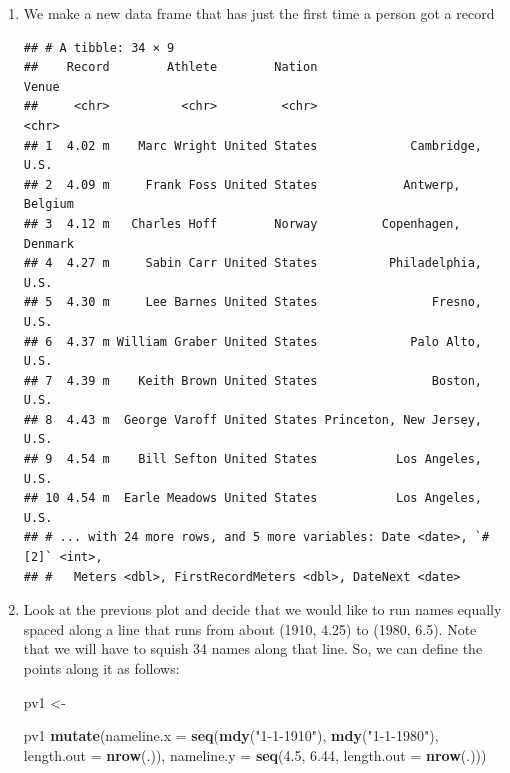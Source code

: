 \documentclass[]{book}
\newenvironment{Shaded}{\begin{snugshade}}{\end{snugshade}}
\newcommand{\KeywordTok}[1]{\textcolor[rgb]{0.13,0.29,0.53}{\textbf{{#1}}}}
\newcommand{\DataTypeTok}[1]{\textcolor[rgb]{0.13,0.29,0.53}{{#1}}}
\newcommand{\DecValTok}[1]{\textcolor[rgb]{0.00,0.00,0.81}{{#1}}}
\newcommand{\FloatTok}[1]{\textcolor[rgb]{0.00,0.00,0.81}{{#1}}}
\newcommand{\StringTok}[1]{\textcolor[rgb]{0.31,0.60,0.02}{{#1}}}
\newcommand{\CommentTok}[1]{\textcolor[rgb]{0.56,0.35,0.01}{\textit{{#1}}}}
\newcommand{\NormalTok}[1]{{#1}}
\theoremstyle{definition}
\theoremstyle{definition}
\theoremstyle{remark}
\begin{document}
\begin{enumerate}
\def\labelenumi{\arabic{enumi}.}
\item
  We make a new data frame that has just the first time a person got a
  record

\begin{Shaded}
\end{Shaded}

\begin{verbatim}
## # A tibble: 34 × 9
##    Record        Athlete        Nation                       Venue
##     <chr>          <chr>         <chr>                       <chr>
## 1  4.02 m    Marc Wright United States             Cambridge, U.S.
## 2  4.09 m     Frank Foss United States            Antwerp, Belgium
## 3  4.12 m   Charles Hoff        Norway         Copenhagen, Denmark
## 4  4.27 m     Sabin Carr United States          Philadelphia, U.S.
## 5  4.30 m     Lee Barnes United States                Fresno, U.S.
## 6  4.37 m William Graber United States             Palo Alto, U.S.
## 7  4.39 m    Keith Brown United States                Boston, U.S.
## 8  4.43 m  George Varoff United States Princeton, New Jersey, U.S.
## 9  4.54 m    Bill Sefton United States           Los Angeles, U.S.
## 10 4.54 m  Earle Meadows United States           Los Angeles, U.S.
## # ... with 24 more rows, and 5 more variables: Date <date>, `#[2]` <int>,
## #   Meters <dbl>, FirstRecordMeters <dbl>, DateNext <date>
\end{verbatim}
\item
  Look at the previous plot and decide that we would like to run names
  equally spaced along a line that runs from about (1910, 4.25) to
  (1980, 6.5). Note that we will have to squish 34 names along that
  line. So, we can define the points along it as follows:

\begin{Shaded}
\begin{Highlighting}[]
\NormalTok{pv1 <-}\StringTok{ }\NormalTok{pv1 %
\StringTok{  }\KeywordTok{mutate}\NormalTok{(}\DataTypeTok{nameline.x =} \KeywordTok{seq}\NormalTok{(}\KeywordTok{mdy}\NormalTok{(}\StringTok{"1-1-1910"}\NormalTok{), }\KeywordTok{mdy}\NormalTok{(}\StringTok{"1-1-1980"}\NormalTok{), }\DataTypeTok{length.out =} \KeywordTok{nrow}\NormalTok{(.)),}
         \DataTypeTok{nameline.y =} \KeywordTok{seq}\NormalTok{(}\FloatTok{4.5}\NormalTok{, }\FloatTok{6.44}\NormalTok{, }\DataTypeTok{length.out =} \KeywordTok{nrow}\NormalTok{(.)))}

}
\end{Highlighting}
\end{Shaded}
\end{enumerate}
\end{document}
